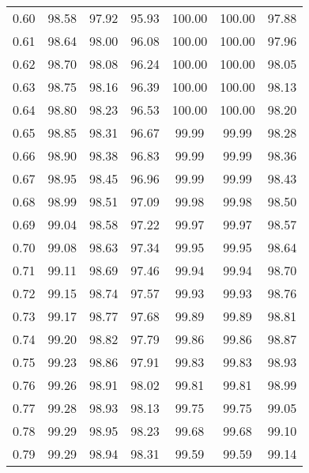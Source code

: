 \begin{tabular}{|c|c|c|c|c|c|c|}
      0.60 &     98.58 &     97.92 &      95.93 &  100.00 &     100.00 &         97.88 \\
      0.61 &     98.64 &     98.00 &      96.08 &  100.00 &     100.00 &         97.96 \\
      0.62 &     98.70 &     98.08 &      96.24 &  100.00 &     100.00 &         98.05 \\
      0.63 &     98.75 &     98.16 &      96.39 &  100.00 &     100.00 &         98.13 \\
      0.64 &     98.80 &     98.23 &      96.53 &  100.00 &     100.00 &         98.20 \\
      0.65 &     98.85 &     98.31 &      96.67 &   99.99 &      99.99 &         98.28 \\
      0.66 &     98.90 &     98.38 &      96.83 &   99.99 &      99.99 &         98.36 \\
      0.67 &     98.95 &     98.45 &      96.96 &   99.99 &      99.99 &         98.43 \\
      0.68 &     98.99 &     98.51 &      97.09 &   99.98 &      99.98 &         98.50 \\
      0.69 &     99.04 &     98.58 &      97.22 &   99.97 &      99.97 &         98.57 \\
      0.70 &     99.08 &     98.63 &      97.34 &   99.95 &      99.95 &         98.64 \\
      0.71 &     99.11 &     98.69 &      97.46 &   99.94 &      99.94 &         98.70 \\
      0.72 &     99.15 &     98.74 &      97.57 &   99.93 &      99.93 &         98.76 \\
      0.73 &     99.17 &     98.77 &      97.68 &   99.89 &      99.89 &         98.81 \\
      0.74 &     99.20 &     98.82 &      97.79 &   99.86 &      99.86 &         98.87 \\
      0.75 &     99.23 &     98.86 &      97.91 &   99.83 &      99.83 &         98.93 \\
      0.76 &     99.26 &     98.91 &      98.02 &   99.81 &      99.81 &         98.99 \\
      0.77 &     99.28 &     98.93 &      98.13 &   99.75 &      99.75 &         99.05 \\
      0.78 &     99.29 &     98.95 &      98.23 &   99.68 &      99.68 &         99.10 \\
      0.79 &     99.29 &     98.94 &      98.31 &   99.59 &      99.59 &         99.14 \\

\end{tabular}
